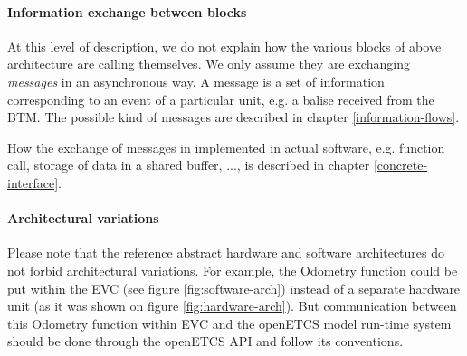 \paragraph{Information exchange between blocks}
At this level of description, we do not explain how the various blocks
of above architecture are calling themselves. We only assume they are
exchanging \emph{messages} in an asynchronous way. A message is a set
of information corresponding to an event of a particular unit, e.g. a
balise received from the BTM. The possible kind of messages are
described in chapter \ref{information-flows}.

How the exchange of messages in implemented in actual software,
e.g. function call, storage of data in a shared buffer, ..., is
described in chapter \ref{concrete-interface}.

\paragraph{Architectural variations}
Please note that the reference abstract hardware and software
architectures do not forbid architectural variations. For example, the
Odometry function could be put within the EVC (see figure
\ref{fig:software-arch}) instead of a separate hardware unit (as it
was shown on figure \ref{fig:hardware-arch}). But communication
between this Odometry function within EVC and the openETCS model
run-time system should be done through the openETCS API and follow its
conventions.

